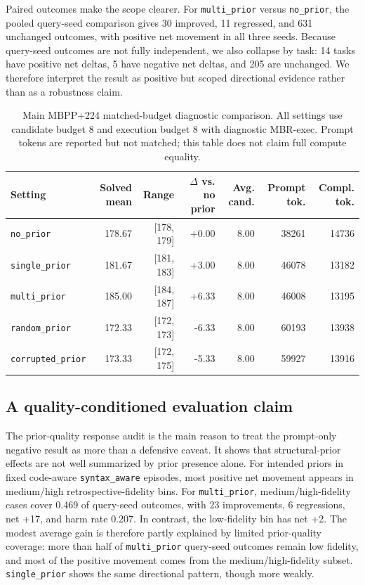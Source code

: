 \documentclass{article}
\newcommand{\code}[1]{\texttt{#1}}
\begin{document}
Paired outcomes make the scope clearer. For \code{multi\_prior} versus \code{no\_prior}, the pooled query-seed comparison gives 30 improved, 11 regressed, and 631 unchanged outcomes, with positive net movement in all three seeds. Because query-seed outcomes are not fully independent, we also collapse by task: 14 tasks have positive net deltas, 5 have negative net deltas, and 205 are unchanged. We therefore interpret the result as positive but scoped directional evidence rather than as a robustness claim.

\begin{table}[H]
\caption{Main MBPP+224 matched-budget diagnostic comparison. All settings use candidate budget 8 and execution budget 8 with diagnostic MBR-exec. Prompt tokens are reported but not matched; this table does not claim full compute equality.}
\label{tab:main-result}
\centering
\footnotesize
\begin{tabular}{lrrrrrr}
\toprule
Setting & Solved mean & Range & $\Delta$ vs. no prior & Avg. cand. & Prompt tok. & Compl. tok. \\
\midrule
\code{no\_prior} & 178.67 & [178, 179] & +0.00 & 8.00 & 38261 & 14736 \\
\code{single\_prior} & 181.67 & [181, 183] & +3.00 & 8.00 & 46078 & 13182 \\
\code{multi\_prior} & 185.00 & [184, 187] & +6.33 & 8.00 & 46008 & 13195 \\
\code{random\_prior} & 172.33 & [172, 173] & -6.33 & 8.00 & 60193 & 13938 \\
\code{corrupted\_prior} & 173.33 & [172, 175] & -5.33 & 8.00 & 59927 & 13916 \\
\bottomrule
\end{tabular}
\end{table}

\subsection{A quality-conditioned evaluation claim}
The prior-quality response audit is the main reason to treat the prompt-only negative result as more than a defensive caveat. It shows that structural-prior effects are not well summarized by prior presence alone. For intended priors in fixed code-aware \code{syntax\_aware} episodes, most positive net movement appears in medium/high retrospective-fidelity bins. For \code{multi\_prior}, medium/high-fidelity cases cover 0.469 of query-seed outcomes, with 23 improvements, 6 regressions, net +17, and harm rate 0.207. In contrast, the low-fidelity bin has net +2. The modest average gain is therefore partly explained by limited prior-quality coverage: more than half of \code{multi\_prior} query-seed outcomes remain low fidelity, and most of the positive movement comes from the medium/high-fidelity subset. \code{single\_prior} shows the same directional pattern, though more weakly.
\end{document}
